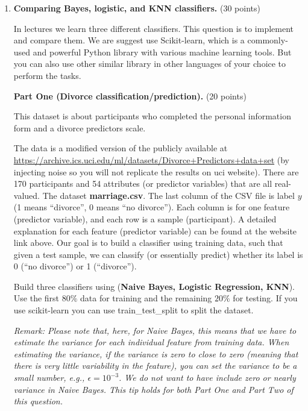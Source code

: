 \documentclass[twoside,10pt]{article}
\begin{document}
\begin{enumerate}
\item {\bf Comparing Bayes, logistic, and KNN classifiers.} (30 points)

In lectures we learn three different classifiers. This question is to implement and compare them. We are suggest use \textsf{Scikit-learn}, which is a commonly-used and powerful \textsf{Python} library with various machine learning tools. But you can also use other similar library in other languages of your choice to perform the tasks. 




\textbf{Part One (Divorce classification/prediction).} (20 points) 

This dataset is about participants who completed the personal information form and a divorce predictors scale. 

The data is a modified version of the publicly available at \url{https://archive.ics.uci.edu/ml/datasets/Divorce+Predictors+data+set} (by injecting noise so you will not replicate the results on uci website). There are 170 participants and 54 attributes (or predictor variables) that are all real-valued. The dataset \textbf{marriage.csv}. The last column of the CSV file is label $y$ (1 means ``divorce'', 0 means ``no divorce''). Each column is for one feature (predictor variable), and each row is a sample (participant). A detailed explanation for each feature (predictor variable) can be found at the website link above. Our goal is to build a classifier using training data, such that given a test sample, we can classify (or essentially predict) whether its label is 0 (``no divorce'') or 1 (``divorce''). 



Build three classifiers using ({\bf Naive Bayes, Logistic Regression, KNN}). Use the first $80\%$ data for training and the remaining $20\%$ for testing. If you use \textsf{scikit-learn} you can use \textsf{train\_test\_split} to split the dataset. 

\textit{Remark: Please note that, here, for Naive Bayes, this means that we have to estimate the variance for each individual feature from training data. When estimating the variance, if the variance is zero to close to zero (meaning that there is very little variability in the feature), you can set the variance to be a small number, e.g., $\epsilon = 10^{-3}$. We do not want to have include zero or nearly variance in Naive Bayes. This tip holds for both Part One and Part Two of this question.}

\begin{enumerate}


\end{enumerate}
\end{enumerate}
\end{document}
